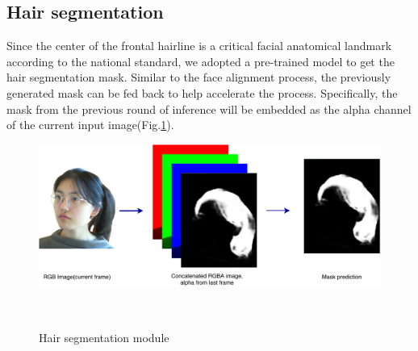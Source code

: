 \subsection{Hair segmentation}
\label{sec:implement-hair-segmentation}
Since the center of the frontal hairline is a critical facial anatomical landmark according to the national standard, we adopted a pre-trained model\cite{tkachenka2019real} to get the hair segmentation mask. Similar to the face alignment process, the previously generated mask can be fed back to help accelerate the process. Specifically, the mask from the previous round of inference will be embedded as the alpha channel of the current input image(Fig.\ref{fig:hair_seg}).
\begin{figure}
  \centering
    \includegraphics[width=0.9\columnwidth]{figures/hair.pdf}
    \caption{Hair segmentation module}~\label{fig:hair_seg}
\end{figure}

